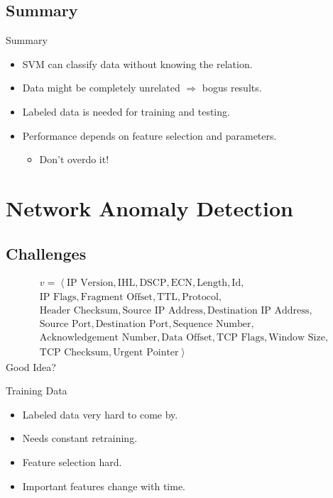 \documentclass{beamer}
\begin{document}
\subsection*{Summary}
\begin{frame}{Summary}
    \begin{itemize}
        \item SVM can classify data without knowing the relation.
        \item<2-| alert@2> Data might be completely unrelated $\Rightarrow$ bogus results.
        \item<3-> Labeled data is needed for training and testing.
        \item<4-> Performance depends on feature selection and parameters.
        \begin{itemize}
            \item<5| alert@5> Don't overdo it!
        \end{itemize}
    \end{itemize}
\end{frame}

\section{Network Anomaly Detection}

\subsection{Challenges}

\begin{frame}
    \begin{gather*}
        v = \left<\text{IP Version}, \text{IHL},\text{DSCP},\text{ECN},\text{Length},\text{Id},\right.\\
        \text{IP Flags},\text{Fragment Offset},\text{TTL},\text{Protocol},\\
        \text{Header Checksum},\text{Source IP Address},\text{Destination IP Address},\\
        \text{Source Port},\text{Destination Port},\text{Sequence Number},\\
        \text{Acknowledgement Number},\text{Data Offset},\text{TCP Flags},\text{Window Size},\\
        \left.\text{TCP Checksum},\text{Urgent Pointer}\right>
    \end{gather*}
    \alert{Good Idea?}
\end{frame}

\begin{frame}{Training Data}
    \begin{itemize}
        \item Labeled data very hard to come by.
        \item Needs constant retraining.
        \item Feature selection hard.
        \item Important features change with time.
    \end{itemize}
\end{frame}
\end{document}
